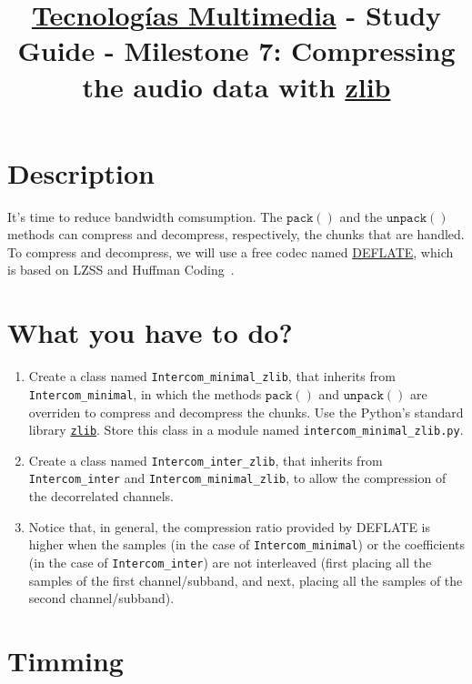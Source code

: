 \title{\href{https://www.ual.es/estudios/grados/presentacion/plandeestudios/asignatura/4015/40154321?idioma=zh_CN}{Tecnologías Multimedia} - Study Guide - Milestone 7: Compressing the audio data with \href{https://zlib.net/}{zlib}}

\maketitle

\section{Description}

It's time to reduce bandwidth comsumption. The $\mathtt{pack()}$ and
the $\mathtt{unpack()}$ methods can compress and decompress,
respectively, the chunks that are handled. To compress and decompress,
we will use a free codec named
\href{https://en.wikipedia.org/wiki/DEFLATE}{DEFLATE}, which is based
on LZSS and Huffman Coding~\cite{nelson96datacompression}.

\section{What you have to do?}

\begin{enumerate}
\item Create a class named \texttt{Intercom\_minimal\_zlib}, that
  inherits from \texttt{Intercom\_minimal}, in which the methods
  $\mathtt{pack()}$ and $\mathtt{unpack()}$ are overriden to compress
  and decompress the chunks. Use the Python's standard library
  \href{https://docs.python.org/3/library/zlib.html}{\texttt{zlib}}. Store
  this class in a module named \texttt{intercom\_minimal\_zlib.py}.
\item Create a class named \texttt{Intercom\_inter\_zlib}, that
  inherits from \texttt{Intercom\_inter} and
  \texttt{Intercom\_minimal\_zlib}, to allow the compression of the
  decorrelated channels.
\item Notice that, in general, the compression ratio provided by
  DEFLATE is higher when the samples (in the case of
  \texttt{Intercom\_minimal}) or the coefficients (in the case of
  \texttt{Intercom\_inter}) are not interleaved (first placing all the
  samples of the first channel/subband, and next, placing all the
  samples of the second channel/subband).
\end{enumerate}

\section{Timming}

